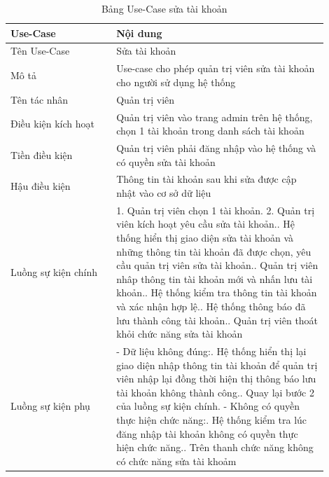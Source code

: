 \begin{longtable}[htp]{ |m{0.3\linewidth}|m{0.6\linewidth}|}
 \caption{Bảng Use-Case sửa tài khoản \label{long}}\\
 \hline
 Use-Case & Nội dung \\
 \hline
 Tên Use-Case & Sửa tài khoản \\
 \hline
 Mô tả & Use-case cho phép quản trị viên sửa tài khoản cho người sử dụng hệ thống\\
 \hline
 Tên tác nhân & Quản trị viên\\
 \hline
 Điều kiện kích hoạt & Quản trị viên vào trang admin trên hệ thống, chọn 1 tài khoản trong danh sách tài khoản\\
 \hline
 Tiền điều kiện & Quản trị viên phải đăng nhập vào hệ thống và có quyền sửa tài khoản\\
 \hline
 Hậu điều kiện & Thông tin tài khoản sau khi sửa được cập nhật vào cơ sở dữ liệu\\
 \hline
 Luồng sự kiện chính & 
 1. Quản trị viên chọn 1 tài khoản.
 2. Quản trị viên kích hoạt yêu cầu sửa tài khoản.\newline
 3. Hệ thống hiển thị giao diện sửa tài khoản và những thông tin tài khoản đã được chọn, yêu cầu quản trị viên sửa tài khoản.\newline
 4. Quản trị viên nhâp thông tin tài khoản mới và nhấn lưu tài khoản.\newline
 5. Hệ thống kiểm tra thông tin tài khoản và xác nhận hợp lệ.\newline
 6. Hệ thống thông báo đã lưu thành công tài khoản.\newline	
 7. Quản trị viên thoát khỏi chức năng sửa tài khoản
 \\
 \hline
 Luồng sự kiện phụ & 
 - Dữ liệu không đúng:\newline
  1. Hệ thống hiển thị lại giao diện nhập thông tin tài khoản để quản trị viên nhập lại đồng thời hiện thị thông báo lưu tài khoản không thành công.\newline
  2. Quay lại bước 2 của luồng sự kiện chính.\newline
  - Không có quyền thực hiện chức năng:\newline
  1. Hệ thống kiểm tra lúc đăng nhập tài khoản không có quyền thực hiện chức năng.\newline
  2. Trên thanh chức năng không có chức năng sửa tài khoảm
 \\
 \hline
\end{longtable}


